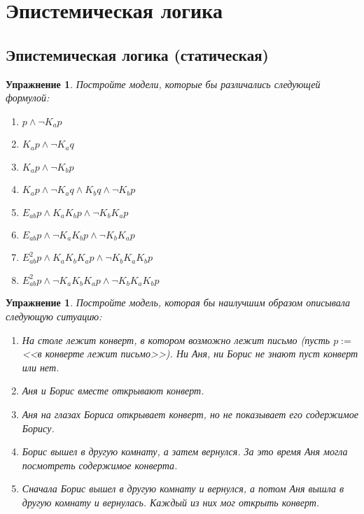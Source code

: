 \documentclass[11pt]{article}
\newtheorem{exercise}[theorem]{Упражнение}
\begin{document}
\section{Эпистемическая логика}

\subsection{Эпистемическая логика (статическая)}

\begin{exercise} Постройте модели, которые бы различались следующей формулой:
\begin{multicols}{2}
\begin{enumerate}
\item $p \wedge \neg K_a p$
\item $K_a p \wedge \neg K_a q$
\item $K_a p \wedge \neg K_b p$
\item $K_a p \wedge \neg K_a q \wedge K_b q \wedge \neg K_b p$
\item $E_{ab}p \wedge K_a K_b p \wedge \neg K_b K_a p$	
\item $E_{ab}p \wedge \neg K_a K_b p \wedge \neg K_b K_a p$
\item $E^2_{ab}p \wedge K_a K_b K_a p \wedge \neg K_b K_a K_b p $
\item $E^2_{ab}p \wedge \neg K_a K_b K_a p \wedge \neg K_b K_a K_b p $
\end{enumerate}
\end{multicols}
\end{exercise}


\begin{exercise} \label{Letter} Постройте модель, которая бы наилучшим образом описывала следующую ситуацию:
\begin{enumerate} 
\item  На столе лежит конверт, в котором возможно лежит письмо (пусть $p:=$ <<в конверте лежит письмо>>). Ни Аня, ни Борис не знают пуст конверт или нет.
\item Аня и Борис вместе открывают конверт.
\item Аня на глазах Бориса открывает конверт, но не показывает его содержимое Борису.
\item Борис вышел в другую комнату, а затем вернулся. За это время Аня могла посмотреть содержимое конверта.
\item Сначала Борис вышел в другую комнату и вернулся, а потом Аня вышла в другую комнату и вернулась. Каждый из них мог открыть конверт. \label{LetterCube}
\end{enumerate}
\end{exercise} 
\end{document}
